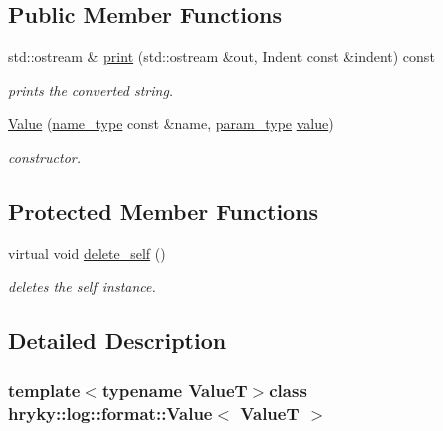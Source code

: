 \subsection*{Public Member Functions}
\begin{DoxyCompactItemize}
\item 
\hypertarget{classhryky_1_1log_1_1format_1_1_base_a9036ce4ca367b322c9f41365ee249cb1}{std\-::ostream \& \hyperlink{classhryky_1_1log_1_1format_1_1_base_a9036ce4ca367b322c9f41365ee249cb1}{print} (std\-::ostream \&out, Indent const \&indent) const }\label{classhryky_1_1log_1_1format_1_1_base_a9036ce4ca367b322c9f41365ee249cb1}

\begin{DoxyCompactList}\small\item\em prints the converted string. \end{DoxyCompactList}\item 
\hyperlink{classhryky_1_1log_1_1format_1_1_value_a6c65d94e7dd9c06484f703455dec523e}{Value} (\hyperlink{namespacehryky_1_1log_1_1format_ab7408d1e2ed2d648dbf9bba69eb74288}{name\-\_\-type} const \&name, \hyperlink{classhryky_1_1log_1_1format_1_1_value_a4e6e8d8330ce51833a08aa0aab7586a4}{param\-\_\-type} \hyperlink{namespacehryky_1_1log_1_1format_a5b9af9c1a7b018d54144acfb1b8cc960}{value})
\begin{DoxyCompactList}\small\item\em constructor. \end{DoxyCompactList}\end{DoxyCompactItemize}
\subsection*{Protected Member Functions}
\begin{DoxyCompactItemize}
\item 
virtual void \hyperlink{classhryky_1_1log_1_1format_1_1_base_af1f3f2984f1a130ca7fd927c62d73ac0}{delete\-\_\-self} ()
\begin{DoxyCompactList}\small\item\em deletes the self instance. \end{DoxyCompactList}\end{DoxyCompactItemize}


\subsection{Detailed Description}
\subsubsection*{template$<$typename Value\-T$>$class hryky\-::log\-::format\-::\-Value$<$ Value\-T $>$}

